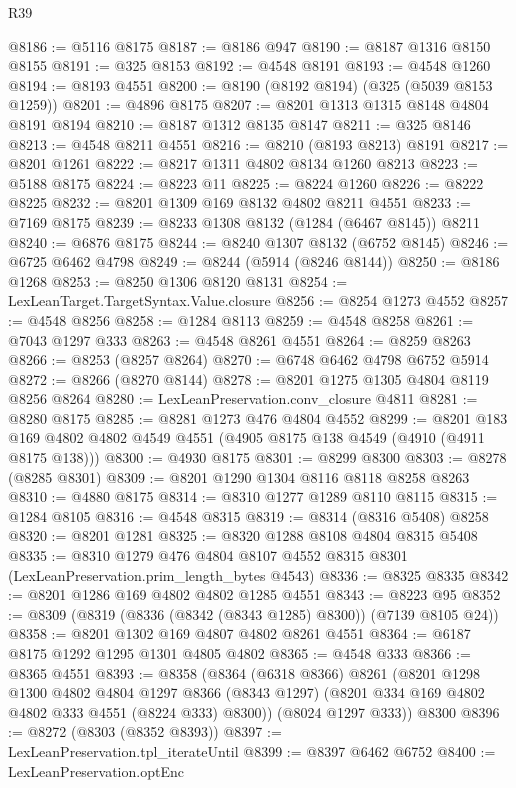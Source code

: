 \begin{lexlean}{R39}
\begin{coremodule}
@8186 := @5116 @8175
@8187 := @8186 @947
@8190 := @8187 @1316 @8150 @8155
@8191 := @325 @8153
@8192 := @4548 @8191
@8193 := @4548 @1260
@8194 := @8193 @4551
@8200 := @8190 (@8192 @8194) (@325 (@5039 @8153 @1259))
@8201 := @4896 @8175
@8207 := @8201 @1313 @1315 @8148 @4804 @8191 @8194
@8210 := @8187 @1312 @8135 @8147
@8211 := @325 @8146
@8213 := @4548 @8211 @4551
@8216 := @8210 (@8193 @8213) @8191
@8217 := @8201 @1261
@8222 := @8217 @1311 @4802 @8134 @1260 @8213
@8223 := @5188 @8175
@8224 := @8223 @11
@8225 := @8224 @1260
@8226 := @8222 @8225
@8232 := @8201 @1309 @169 @8132 @4802 @8211 @4551
@8233 := @7169 @8175
@8239 := @8233 @1308 @8132 (@1284 (@6467 @8145)) @8211
@8240 := @6876 @8175
@8244 := @8240 @1307 @8132 (@6752 @8145)
@8246 := @6725 @6462 @4798
@8249 := @8244 (@5914 (@8246 @8144))
@8250 := @8186 @1268
@8253 := @8250 @1306 @8120 @8131
@8254 := LexLeanTarget.TargetSyntax.Value.closure
@8256 := @8254 @1273 @4552
@8257 := @4548 @8256
@8258 := @1284 @8113
@8259 := @4548 @8258
@8261 := @7043 @1297 @333
@8263 := @4548 @8261 @4551
@8264 := @8259 @8263
@8266 := @8253 (@8257 @8264)
@8270 := @6748 @6462 @4798 @6752 @5914
@8272 := @8266 (@8270 @8144)
@8278 := @8201 @1275 @1305 @4804 @8119 @8256 @8264
@8280 := LexLeanPreservation.conv_closure @4811
@8281 := @8280 @8175
@8285 := @8281 @1273 @476 @4804 @4552
@8299 := @8201 @183 @169 @4802 @4802 @4549 @4551 (@4905 @8175 @138 @4549 (@4910 (@4911 @8175 @138)))
@8300 := @4930 @8175
@8301 := @8299 @8300
@8303 := @8278 (@8285 @8301)
@8309 := @8201 @1290 @1304 @8116 @8118 @8258 @8263
@8310 := @4880 @8175
@8314 := @8310 @1277 @1289 @8110 @8115
@8315 := @1284 @8105
@8316 := @4548 @8315
@8319 := @8314 (@8316 @5408) @8258
@8320 := @8201 @1281
@8325 := @8320 @1288 @8108 @4804 @8315 @5408
@8335 := @8310
    @1279
    @476
    @4804
    @8107
    @4552
    @8315
    @8301
    (LexLeanPreservation.prim_length_bytes @4543)
@8336 := @8325 @8335
@8342 := @8201 @1286 @169 @4802 @4802 @1285 @4551
@8343 := @8223 @95
@8352 := @8309 (@8319 (@8336 (@8342 (@8343 @1285) @8300)) (@7139 @8105 @24))
@8358 := @8201 @1302 @169 @4807 @4802 @8261 @4551
@8364 := @6187 @8175 @1292 @1295 @1301 @4805 @4802
@8365 := @4548 @333
@8366 := @8365 @4551
@8393 := @8358
    (@8364
      (@6318 @8366)
      @8261
      (@8201
        @1298
        @1300
        @4802
        @4804
        @1297
        @8366
        (@8343 @1297)
        (@8201 @334 @169 @4802 @4802 @333 @4551 (@8224 @333) @8300))
      (@8024 @1297 @333))
    @8300
@8396 := @8272 (@8303 (@8352 @8393))
@8397 := LexLeanPreservation.tpl_iterateUntil
@8399 := @8397 @6462 @6752
@8400 := LexLeanPreservation.optEnc

\end{coremodule}
\end{lexlean}
